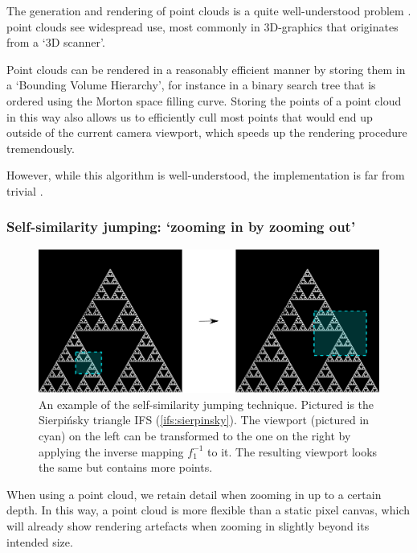 \documentclass[11pt]{article}
\begin{document}
The generation and rendering of point clouds is a quite well-understood problem \cite{wimmer2006instant}. point clouds see widespread use,
most commonly in 3D-graphics that originates from a `3D scanner'.

Point clouds can be rendered in a reasonably efficient manner by storing them in a `Bounding Volume Hierarchy',
for instance in a binary search tree that is ordered using the Morton space filling curve. \cite{lauterbach2009construction}
Storing the points of a point cloud in this way also allows us to efficiently cull most points that would end up outside of the current camera viewport,
which speeds up the rendering procedure tremendously.

However, while this algorithm is well-understood, the implementation is far from trivial \cite{lauterbach2009construction}.

\subsubsection{Self-similarity jumping: `zooming in by zooming out'}
\label{sec:orgd39aa92}
\label{subsection:self_similarity}

\begin{figure}

\includegraphics[width=\textwidth]{figures/sierpinsky_jump}
\caption{An example of the self-similarity jumping technique. Pictured is the Sierpi\'nsky triangle IFS (\autoref{ifs:sierpinsky}).
The viewport (pictured in cyan) on the left can be transformed to the one on the right by applying the inverse mapping $f_1^{-1}$ to it.
The resulting viewport looks the same but contains more points.}
\label{figure:sierpinsky_jump}
\end{figure}

When using a point cloud, we retain detail when zooming in up to a certain depth. In this way, a point cloud is more flexible than a 
static pixel canvas, which will already show rendering artefacts when zooming in slightly beyond its intended size.
\end{document}
